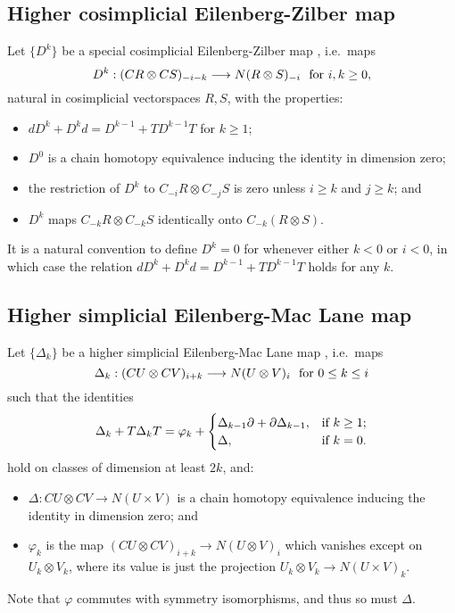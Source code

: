 \documentclass[11pt]{amsart}
\theoremstyle{plain}
\theoremstyle{definition}
\let\phi\varphi
\renewcommand{\to}{\longrightarrow}
\theoremstyle{plain}
\begin{document}
\subsection{Higher cosimplicial Eilenberg-Zilber map}
Let $\{D^k\}$ be a special cosimplicial Eilenberg-Zilber map \cite[5.2]{turner_opns_and_sseqs_I.pdf}, i.e.\  maps
\[D^k:(CR\otimes CS)_{-i-k}\to N(R\otimes S)_{-i}\textup{\ \ for $i,k\geq0$},\]
natural in cosimplicial vectorspaces $R,S$,
with the properties:
\begin{itemize}
\setlength{\parindent}{.25in}
\item $dD^k+D^kd=D^{k-1}+TD^{k-1}T$ for $k\geq1$;
\item $D^0$ is a chain homotopy equivalence inducing the identity in dimension zero;
\item the restriction of $D^k$ to $C_{-i}R\otimes C_{-j}S$ is zero unless $i\geq k$ and $j\geq k$; and
\item $D^k$ maps $C_{-k}R\otimes C_{-k}S$ identically onto $C_{-k}(R\otimes S)$.
\end{itemize}
It is a natural convention to define $D^k=0$ for whenever either $k<0$ or $i<0$, in which case the relation $dD^k+D^kd=D^{k-1}+TD^{k-1}T$ holds for any $k$.
\subsection{Higher simplicial Eilenberg-Mac Lane map}
Let $\{\Delta_k\}$ be a higher simplicial Eilenberg-Mac Lane map \cite[\S3]{DwyerHtpyOpsSimpComAlg.pdf}, i.e.\ maps
\[\Delta_k:(CU\otimes CV)_{i+k}\to N(U\otimes V)_i\textup{\ \ for $0\leq k\leq i$}\]
such that the identities
\[\Delta_k+T\Delta_kT=\phi_k+\begin{cases}
\Delta_{k-1}\partial+\partial\Delta_{k-1},&\textup{if }k\geq1;\\
\Delta,&\textup{if }k=0.
\end{cases}
\]
hold on classes of dimension at least $2k$, and:
\begin{itemize}
\setlength{\parindent}{.25in}
\item $\Delta:CU\otimes CV\to N(U\times V)$ is a chain homotopy equivalence inducing the identity in dimension zero; and
\item $\phi_k$ is the map $(CU\otimes CV)_{i+k}\to N(U\otimes V)_i$ which vanishes except on $U_k\otimes V_k$, where its value is just the projection $U_k\otimes V_k\to N(U\times V)_k$.
\end{itemize}
Note that $\phi$ commutes with symmetry isomorphisms, and thus so must $\Delta$.
\end{document}
